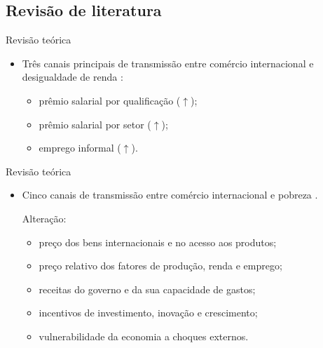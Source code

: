 \documentclass[10pt]{sintefbeamer}
\begin{document}
\subsection[]{Revisão de literatura}

\begin{frame}{Revisão teórica}
	\begin{itemize}
		\item Três canais principais de transmissão entre comércio internacional e desigualdade de renda \cite{goldbergpavcnik04}:
		
		\begin{itemize}
			\item prêmio salarial por qualificação ($\uparrow$);
			
			\item prêmio salarial por setor ($\uparrow$);
			
			\item emprego informal ($\uparrow$).
		\end{itemize}
	\end{itemize}
\end{frame}

\begin{frame}{Revisão teórica}
	\begin{itemize}
		\item Cinco canais de transmissão entre comércio internacional e pobreza \cite{bannisterthugge01}.
		
		Alteração:
		
		\begin{itemize}
			\item preço dos bens internacionais e no acesso aos produtos;
			
			\item preço relativo dos fatores de produção, renda e emprego;
			
			\item receitas do governo e da sua capacidade de gastos;
			
			\item incentivos de investimento, inovação e crescimento;
			
			\item vulnerabilidade da economia a choques externos.
		\end{itemize}
	\end{itemize}
\end{frame}
\end{document}
